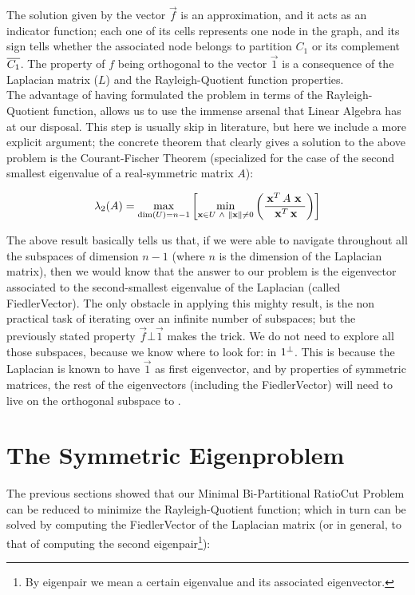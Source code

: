 The solution given by the vector $\vec{f}$ is an approximation, and it acts
as an indicator function; each one of its cells represents one node in
the graph, and its sign tells whether the associated node belongs to
partition $C_1$ or its complement $\overline{C_1}$. The property of $f$
being orthogonal to the vector $\vec{1}$ is a consequence of the
\gls{Laplacian} matrix ($L$) and the Rayleigh-Quotient function
properties. \\

The advantage of having formulated the problem in terms of the
Rayleigh-Quotient function, allows us to use the immense arsenal that
Linear Algebra has at our disposal. This step is usually skip in
literature, but here we include a more explicit argument; the concrete
theorem that clearly gives a solution to the above problem is the
Courant-Fischer Theorem (specialized for the case of the second
smallest eigenvalue of a real-symmetric matrix $A$):

\begin{equation*}
\lambda_2(A) =
\max\limits_{\operatorname{dim}(U) = n-1}
\left[
\min\limits_{\mathbf{x} \in U \,\,\land\,\, \left\lVert \mathbf{x} \right\rVert \ne 0}
\left(  
\dfrac{\,{\mathbf{x}}^{T}\, A \,\,\mathbf{x}\,\,}{\,{\mathbf{x}}^{T}\, \mathbf{x}}
\right)
\right]
\end{equation*}
\joinbelow{1cm}

The above result basically tells us that, if we were able to navigate
throughout all the subspaces of dimension $n-1$ (where $n$ is the
dimension of the \gls{Laplacian} matrix), then we would know that the answer
to our problem is the eigenvector associated to the second-smallest
eigenvalue of the \gls{Laplacian} (called \gls{FiedlerVector}). The only obstacle
in applying this mighty result, is the non practical task of iterating
over an infinite number of subspaces; but the previously stated
property $\vec{f} \bot \vec{1}$ makes the trick. We do not need to
explore all those subspaces, because we know where to look for: in
${1}^{\bot}$. This is because the \gls{Laplacian} is known to have $\vec{1}$ as first
eigenvector, and by properties of symmetric matrices, the rest of the
eigenvectors (including the \gls{FiedlerVector}) will need to live on the
orthogonal subspace to . 

\section{The Symmetric Eigenproblem}

The previous sections showed that our Minimal Bi-Partitional RatioCut
Problem can be reduced to minimize the Rayleigh-Quotient function;
which in turn can be solved by computing the \gls{FiedlerVector} of the
\gls{Laplacian} matrix (or in general, to that of computing the second
eigenpair\footnote{By eigenpair we mean a certain eigenvalue and its associated eigenvector.}): 

